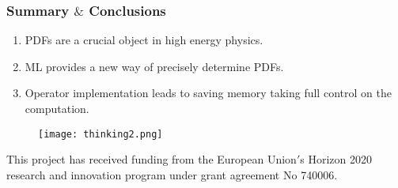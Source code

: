 \documentclass[aspectratio=43]{beamer}
\begin{document}
\begin{frame}
	
	\frametitle{Summary $\&$ Conclusions}

	\begin{enumerate}
		\item PDFs are a crucial object in high energy physics.
		\item ML provides a new way of precisely determine PDFs.
		\item Operator implementation leads to saving memory taking full control on the computation.
	\end{enumerate}

\end{frame}

\begin{frame}


	\begin{figure}
		\texttt{[image: thinking2.png]}
	\end{figure}
	
	{\small \color{blue} This project has received funding from the European Union$'$s Horizon 2020 research and innovation program under grant agreement No 740006.}

\end{frame}
\end{document}
